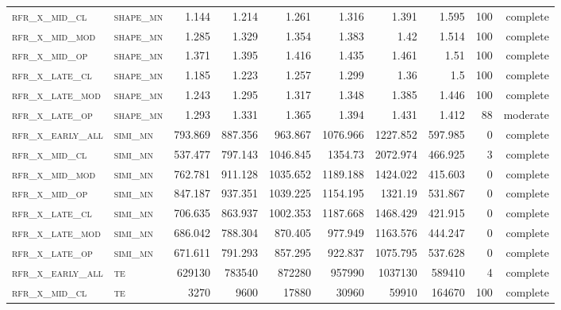 \begin{landscape}
\begin{center}
\begin{footnotesize}
\begin{longtable}{llrrrrr|rrr}
\textsc{rfr\_x\_mid\_cl   } & \textsc{shape\_mn }   & 1.144   & 1.214   & 1.261    & 1.316    & 1.391    & 1.595   & 100 & complete \\
\textsc{rfr\_x\_mid\_mod  } & \textsc{shape\_mn }   & 1.285   & 1.329   & 1.354    & 1.383    & 1.42     & 1.514   & 100 & complete \\
\textsc{rfr\_x\_mid\_op   } & \textsc{shape\_mn }   & 1.371   & 1.395   & 1.416    & 1.435    & 1.461    & 1.51    & 100 & complete \\
\textsc{rfr\_x\_late\_cl  } & \textsc{shape\_mn }   & 1.185   & 1.223   & 1.257    & 1.299    & 1.36     & 1.5     & 100 & complete \\
\textsc{rfr\_x\_late\_mod } & \textsc{shape\_mn }   & 1.243   & 1.295   & 1.317    & 1.348    & 1.385    & 1.446   & 100 & complete \\
\textsc{rfr\_x\_late\_op  } & \textsc{shape\_mn }   & 1.293   & 1.331   & 1.365    & 1.394    & 1.431    & 1.412   & 88  & moderate \\
\textsc{rfr\_x\_early\_all} & \textsc{simi\_mn  }   & 793.869 & 887.356 & 963.867  & 1076.966 & 1227.852 & 597.985 & 0   & complete \\
\textsc{rfr\_x\_mid\_cl   } & \textsc{simi\_mn  }   & 537.477 & 797.143 & 1046.845 & 1354.73  & 2072.974 & 466.925 & 3   & complete \\
\textsc{rfr\_x\_mid\_mod  } & \textsc{simi\_mn  }   & 762.781 & 911.128 & 1035.652 & 1189.188 & 1424.022 & 415.603 & 0   & complete \\
\textsc{rfr\_x\_mid\_op   } & \textsc{simi\_mn  }   & 847.187 & 937.351 & 1039.225 & 1154.195 & 1321.19  & 531.867 & 0   & complete \\
\textsc{rfr\_x\_late\_cl  } & \textsc{simi\_mn  }   & 706.635 & 863.937 & 1002.353 & 1187.668 & 1468.429 & 421.915 & 0   & complete \\
\textsc{rfr\_x\_late\_mod } & \textsc{simi\_mn  }   & 686.042 & 788.304 & 870.405  & 977.949  & 1163.576 & 444.247 & 0   & complete \\
\textsc{rfr\_x\_late\_op  } & \textsc{simi\_mn  }   & 671.611 & 791.293 & 857.295  & 922.837  & 1075.795 & 537.628 & 0   & complete \\
\textsc{rfr\_x\_early\_all} & \textsc{te  	    }   & 629130  & 783540  & 872280   & 957990   & 1037130  & 589410  & 4   & complete \\
\textsc{rfr\_x\_mid\_cl   } & \textsc{te        }   & 3270    & 9600    & 17880    & 30960    & 59910    & 164670  & 100 & complete \\

\end{longtable}
\end{footnotesize}
\end{center}
\end{landscape}

